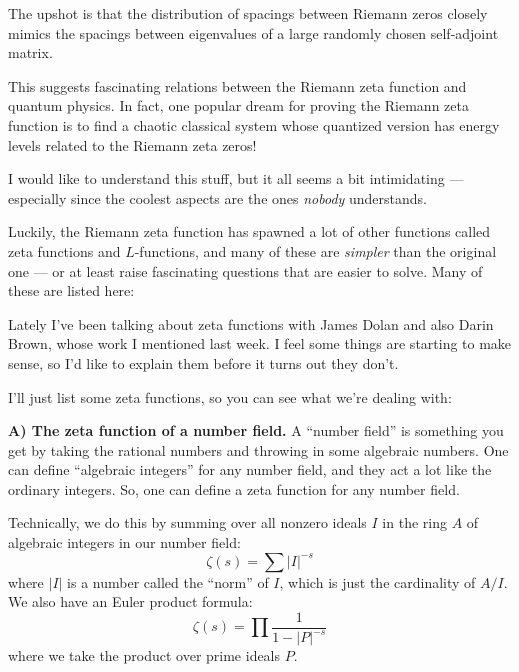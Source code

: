 \documentclass{article}
\renewcommand{\texttt}[1]{%
  \begingroup
  \ttfamily
  \begingroup\lccode`~=`/\lowercase{\endgroup\def~}{/\discretionary{}{}{}}%
  \begingroup\lccode`~=`[\lowercase{\endgroup\def~}{[\discretionary{}{}{}}%
  \begingroup\lccode`~=`.\lowercase{\endgroup\def~}{.\discretionary{}{}{}}%
  \catcode`/=\active\catcode`[=\active\catcode`.=\active
  \scantokens{#1\noexpand}%
  \endgroup
}
\begin{document}
The upshot is that the distribution of spacings between Riemann zeros
closely mimics the spacings between eigenvalues of a large randomly
chosen self-adjoint matrix.

This suggests fascinating relations between the Riemann zeta function
and quantum physics. In fact, one popular dream for proving the Riemann
zeta function is to find a chaotic classical system whose quantized
version has energy levels related to the Riemann zeta zeros!

I would like to understand this stuff, but it all seems a bit
intimidating --- especially since the coolest aspects are the ones
\emph{nobody} understands.

Luckily, the Riemann zeta function has spawned a lot of other functions
called zeta functions and \(L\)-functions, and many of these are
\emph{simpler} than the original one --- or at least raise fascinating
questions that are easier to solve. Many of these are listed here:


Lately I've been talking about zeta functions with James Dolan and also
Darin Brown, whose work I mentioned last week. I feel some things are
starting to make sense, so I'd like to explain them before it turns out
they don't.

I'll just list some zeta functions, so you can see what we're dealing
with:

\textbf{A) The zeta function of a number field.} A ``number field'' is
something you get by taking the rational numbers and throwing in some
algebraic numbers. One can define ``algebraic integers'' for any number
field, and they act a lot like the ordinary integers. So, one can define
a zeta function for any number field.

Technically, we do this by summing over all nonzero ideals \(I\) in the
ring \(A\) of algebraic integers in our number field:
\[\zeta(s) = \sum |I|^{-s}\] where \(|I|\) is a number called the
``norm'' of \(I\), which is just the cardinality of \(A/I\). We also
have an Euler product formula:
\[\zeta(s) = \prod \frac{1}{1 - |P|^{-s}}\] where we take the product
over prime ideals \(P\).
\end{document}
